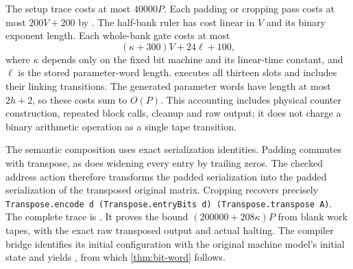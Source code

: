 The setup trace  costs at most $40000P$.
Each padding or cropping pass costs at most $200V+200$ by
. The half-bank ruler has cost linear
in $V$ and its binary exponent length. Each whole-bank gate costs at most
\[
                  (\kappa+300)V+24\ell+100,
\]
where $\kappa$ depends only on the fixed bit machine and its linear-time
constant, and $\ell$ is the stored parameter-word length.
 executes all thirteen slots and includes
their linking transitions. The generated parameter words have length at most
$2h+2$, so these costs sum to $O(P)$. This accounting includes physical
counter construction, repeated block calls, cleanup and raw output; it does
not charge a binary arithmetic operation as a single tape transition.

The semantic composition uses exact serialization identities. Padding commutes
with transpose, as does widening every entry by trailing zeros. The checked
address action therefore transforms the padded serialization into the padded
serialization of the transposed original matrix. Cropping recovers precisely
{\small\texttt{Transpose.encode d (Transpose.entryBits d) (Transpose.transpose A)}}.
The complete trace is .
It proves the bound $(200000+208\kappa)P$ from blank work tapes, with the exact
raw transposed output and actual halting. The compiler bridge identifies its
initial configuration with the original machine model's initial state and
yields , from which
\cref{thm:bit-word} follows.
